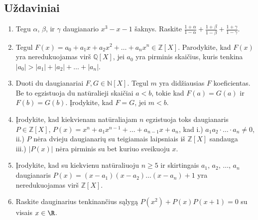 \subsection{Uždaviniai}

\begin{enumerate}

\item Tegu $\alpha$, $\beta$, ir $\gamma$ daugianario $x^3 - x - 1$ šaknys.
  Raskite $\frac{1+\alpha}{1-\alpha} + \frac{1+\beta}{1-\beta} +
  \frac{1+\gamma}{1-\gamma}.$ \item Tegul
  $F(x)=a_0+a_1x+a_2x^2+\ldots+a_nx^n\in\mathbb{Z}[X]$. Parodykite, kad
  $F(x)$ yra neredukuojamas virš $\mathbb{Q}[X]$, jei $a_0$ yra pirminis
  skaičius, kuris tenkina $|a_0|>|a_1|+|a_2|+\ldots+|a_n|$.  \item Duoti du
  daugianariai $F, G\in\mathbb{N}[X]$. Tegul $m$ yra didžiausias $F$
  koeficientas. Be to egzistuoja du natūralieji skaičiai $a<b$, tokie kad
  $F(a)=G(a)$ ir $F(b)=G(b)$. Įrodykite, kad $F=G$, jei $m<b$.  \item
  Įrodykite, kad kiekvienam natūraliajam $n$ egzistuoja toks daugianaris
  $P\in\mathbb{Z}[X]$, $P(x)=x^n+a_1x^{n-1}+\ldots+a_{n-1}x+a_n$, kad i.)
  $a_1a_2\cdot\ldots\cdot a_n\neq 0$, \\ ii.)  $P$ nėra dvieju daugianarių
  su teigiamais laipsniais iš $\mathbb{Z}[X]$ sandauga\\ iii.) $|P(x)|$
  nėra pirminis su bet kuriuo sveikuoju $x$.  \item Įrodykite, kad su
  kiekvienu natūraliuoju $n\ge5$ ir skirtingais $a_1$, $a_2$, $\ldots$,
  $a_n$ daugianaris $P(x)=(x-a_1)(x-a_2)\ldots(x-a_n)+1$ yra neredukuojamas
  virš $\mathbb{Z}[X]$.  \item Raskite dauginarius tenkinančius sąlygą
  $P(x^2) + P(x)P(x+1) = 0$ su visais $x \in \R$.
\end{enumerate}
